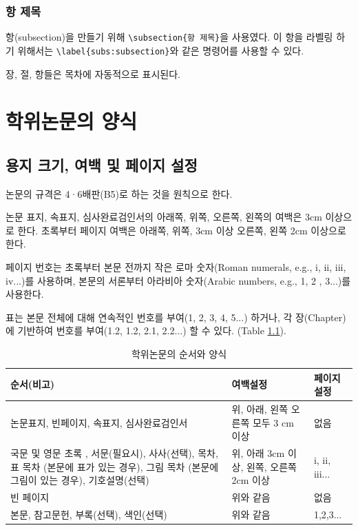 \documentclass[11pt]{report}
\numberwithin{figure}{section}
\theoremstyle{plain}
\theoremstyle{definition}
\theoremstyle{corollary}
\theoremstyle{definition}
\theoremstyle{plain}
\theoremstyle{definition}
\theoremstyle{plain}
\begin{document}
%
\subsection{항 제목}\label{subs:subsection}
항(subsection)을 만들기 위해 \verb|\subsection{항 제목}|을 사용였다.
이 항을 라벨링 하기 위해서는 \verb|\label{subs:subsection}|와 같은 명령어를 사용할 수 있다.

장, 절, 항들은 목차에 자동적으로 표시된다.

\chapter{학위논문의 양식}\label{chap:organizing}

\section{용지 크기, 여백 및 페이지 설정} \label{sec:papersize}
논문의 규격은 4·6배판(B5)로 하는 것을 원칙으로 한다.

논문 표지, 속표지, 심사완료검인서의 아래쪽, 위쪽, 오른쪽, 왼쪽의 여백은 3cm 이상으로 한다. 초록부터 페이지 여백은 아래쪽, 위쪽, 3cm 이상 오른쪽, 왼쪽 2cm 이상으로 한다.

페이지 번호는 초록부터 본문 전까지 작은 로마 숫자(Roman numerals, e.g., i, ii, iii, iv...)를 사용하며, 본문의 서론부터 아라비아 숫자(Arabic numbers, e.g., 1, 2 , 3...)를 사용한다.

표는 본문 전체에 대해 연속적인 번호를 부여(1, 2, 3, 4, 5...) 하거나, 각 장(Chapter)에 기반하여 번호를 부여(1.2, 1.2, 2.1, 2.2...) 할 수 있다. (Table \ref{tab:Organizing and formatting}).

\renewcommand\tablename{표}
\begin{table}
\caption{학위논문의 순서와 양식}
\label{tab:Organizing and formatting}
\vspace{0.5cm}
\begin{tabular}{ m{7cm} m{3cm} m{2cm}}
\hline
순서(비고) & 여백설정& 페이지설정\\\hline
논문표지, 빈페이지, 속표지, 심사완료검인서  &	 위, 아래, 왼쪽 오른쪽 모두 3 cm 이상	&	없음\\\hline
국문 및 영문 초록 , 서문(필요시), 사사(선택), 목차, 표 목차 (본문에 표가 있는 경우), 그림 목차 (본문에 그림이 있는 경우), 기호설명(선택)	& 위, 아래 3cm 이상, 왼쪽, 오른쪽 2cm 이상  &  i, ii, iii...         \\\hline		
빈 페이지 & 위와 같음 & 없음\\\hline
본문, 참고문헌, 부록(선택), 색인(선택) & 위와 같음 & 1,2,3...	\\\hline

\end{tabular}
\end{table}
\end{document}
